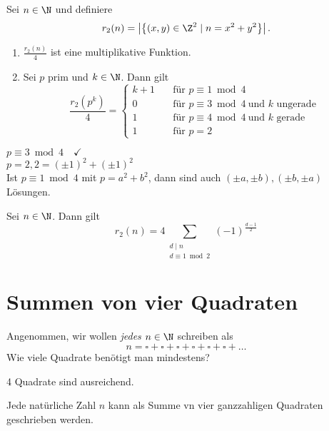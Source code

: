 \begin{thm}\autolabel
	Sei $n \in \N$ und definiere
	\[ r_2(n) = \left| \left\{ (x,y) \in \Z^2 \mid n = x^2 + y^2 \right\} \right|. \]
	\begin{enumerate}[label={\roman*})]
		\item $\frac{r_2(n)}{4}$ ist eine multiplikative Funktion.
		\item Sei $p$ prim und $k \in \N$. Dann gilt
			\[ \frac{r_2(p^k)}{4} = \begin{cases}
				k+1 \quad &\text{für } p \equiv 1 \bmod 4\\
				0 \quad &\text{für } p \equiv 3 \bmod 4 \ \text{und $k$ ungerade}\\
				1 \quad &\text{für } p \equiv 4 \bmod 4 \ \text{und $k$ gerade}\\
				1 \quad &\text{für } p = 2
			\end{cases} \]
	\end{enumerate}
\end{thm}

\begin{exmp*}
	$p \equiv 3 \bmod 4 \quad \checkmark$\\
	$p = 2, 2 = (\pm 1)^2 + (\pm 1)^2$\\
	Ist $p \equiv 1 \bmod 4$ mit $p = a^2+b^2$, dann sind auch $(\pm a,\pm b),(\pm b, \pm a)$ Lösungen.
\end{exmp*}

\begin{thm}[Dirichlet]\autolabel
	Sei $n \in \N$. Dann gilt
	\[ r_2(n) = 4 \sum_{\substack{d \mid n \\ d \equiv 1 \bmod 2}} (-1)^{\frac{d-1}{2}} \]
\end{thm}

\section{Summen von vier Quadraten}

\begin{frage*}
	Angenommen, wir wollen \emph{jedes} $n \in \N$ schreiben als
	\[ n = \square + \square + \square + \square + \square + \square + \dots \]
	Wie viele Quadrate benötigt man mindestens?
\end{frage*}

\begin{obs*}
	4 Quadrate sind ausreichend.
\end{obs*}

\begin{thm}\autolabel
	Jede natürliche Zahl $n$ kann als Summe vn vier ganzzahligen Quadraten geschrieben werden.
\end{thm}

